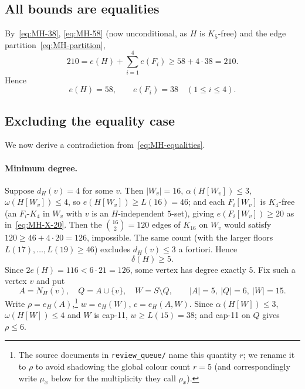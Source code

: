 \documentclass[11pt,reqno]{amsart}
\theoremstyle{definition}
\theoremstyle{remark}
\newcommand{\abs}[1]{\left|#1\right|}
\newcommand{\capeleven}{\textsf{cap-11}}
\begin{document}
\subsection{All bounds are equalities}\label{ssec:MH-eq}
By~\eqref{eq:MH-38}, \eqref{eq:MH-58} (now unconditional, as $H$ is $K_5$-free) and
the edge partition~\eqref{eq:MH-partition},
\[
  210=e(H)+\sum_{i=1}^4 e(F_i)\ge 58+4\cdot 38=210 .
\]
Hence
\begin{equation}\label{eq:MH-equalities}
  e(H)=58,\qquad e(F_i)=38\quad(1\le i\le 4).
\end{equation}

\subsection{Excluding the equality case}\label{ssec:MH-endgame}
We now derive a contradiction from~\eqref{eq:MH-equalities}.

\paragraph{Minimum degree.}
Suppose $d_H(v)=4$ for some $v$. Then $\abs{W_v}=16$, $\alpha(H[W_v])\le 3$,
$\omega(H[W_v])\le 4$, so $e(H[W_v])\ge L(16)=46$; and each $F_i[W_v]$ is $K_4$-free
(an $F_i$-$K_4$ in $W_v$ with $v$ is an $H$-independent $5$-set), giving
$e(F_i[W_v])\ge 20$ as in~\eqref{eq:MH-X-20}. Then the $\binom{16}2=120$ edges of
$K_{16}$ on $W_v$ would satisfy $120\ge 46+4\cdot 20=126$, impossible. The same count
(with the larger floors $L(17),\dots,L(19)\ge 46$) excludes $d_H(v)\le 3$ a
fortiori. Hence
\begin{equation}\label{eq:MH-delta5}
  \delta(H)\ge 5 .
\end{equation}
Since $2e(H)=116<6\cdot 21=126$, some vertex has degree exactly $5$. Fix such a
vertex $v$ and put
\[
  A=N_H(v),\quad Q=A\cup\{v\},\quad W=S\setminus Q,\qquad \abs A=5,\ \abs Q=6,\ \abs W=15 .
\]
Write $\rho=e_H(A)$,\footnote{The source documents in \texttt{review\_queue/} name
this quantity $r$; we rename it to $\rho$ to avoid shadowing the global colour count
$r=5$ (and correspondingly write $\mu_x$ below for the multiplicity they call
$\rho_x$).} $w=e_H(W)$, $c=e_H(A,W)$. Since $\alpha(H[W])\le 3$,
$\omega(H[W])\le 4$ and $W$ is \capeleven, $w\ge L(15)=38$; and \capeleven{} on $Q$
gives $\rho\le 6$.
\end{document}
